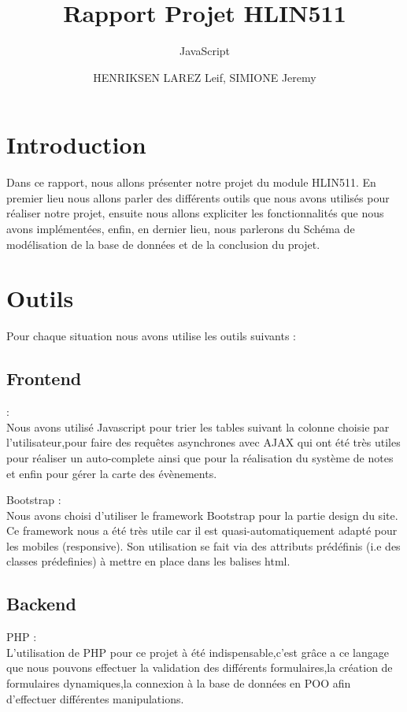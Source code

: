 \documentclass[french]{article}
\title{Rapport Projet HLIN511}
\author{HENRIKSEN LAREZ Leif, SIMIONE Jeremy}
\date{}
\begin{document}
    \begin{titlepage}
        \clearpage\maketitle
        \thispagestyle{empty}
    \end{titlepage}
    \newpage
        \tableofcontents
    \newpage
        \section{Introduction}
            Dans ce rapport, nous allons présenter notre projet du module HLIN511. En premier lieu nous allons parler des différents outils que nous avons utilisés pour réaliser notre projet, ensuite nous allons expliciter les fonctionnalités que nous avons implémentées, enfin, en dernier lieu, nous parlerons du Schéma de modélisation de la base de données et de la conclusion du projet.
        \section{Outils}
            Pour chaque situation nous avons utilise les outils suivants :
            \subsection{Frontend}
            \subtitle{JavaScript} : \\Nous avons utilisé Javascript pour trier les tables suivant la colonne choisie par l'utilisateur,pour faire des requêtes asynchrones avec AJAX qui ont été très utiles pour réaliser un auto-complete ainsi que pour la réalisation du système de notes et enfin pour gérer la carte des évènements.\\
            \par
             Bootstrap : \\ Nous avons choisi d'utiliser le framework Bootstrap pour la partie design du site.
            Ce framework nous a été très utile car il est quasi-automatiquement adapté pour les mobiles (responsive).
            Son utilisation se fait via des attributs prédéfinis (i.e des classes prédefinies) à mettre en place dans les balises html. 
            
            \subsection{Backend}
            PHP :\\ L'utilisation de PHP pour ce projet à été indispensable,c'est grâce a ce langage que nous pouvons effectuer la validation des différents formulaires,la création de formulaires dynamiques,la connexion à la base de données en POO afin d'effectuer différentes manipulations.
\end{document}
